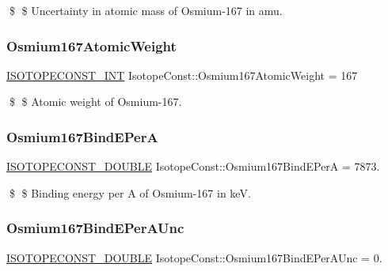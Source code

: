 \$ \$ Uncertainty in atomic mass of Osmium-\/167 in amu. \mbox{\label{group___isotope_const-_osmium-_os167_ga05619135e44b0fca13c9debaf6ab58ed}} 
\subsubsection{\texorpdfstring{Osmium167\+Atomic\+Weight}{Osmium167AtomicWeight}}
{\footnotesize\ttfamily \mbox{\hyperlink{group___isotope_const-_macros_ga5f18360b3e99483a35c32d789e62621c}{I\+S\+O\+T\+O\+P\+E\+C\+O\+N\+S\+T\+\_\+\+I\+NT}} Isotope\+Const\+::\+Osmium167\+Atomic\+Weight = 167}

\$ \$ Atomic weight of Osmium-\/167. \mbox{\label{group___isotope_const-_osmium-_os167_gae01c761b289cca79e813525bfec2d3a3}} 
\subsubsection{\texorpdfstring{Osmium167\+Bind\+E\+PerA}{Osmium167BindEPerA}}
{\footnotesize\ttfamily \mbox{\hyperlink{group___isotope_const-_macros_ga8f45a7272ce02c0b4c65c44636ed719a}{I\+S\+O\+T\+O\+P\+E\+C\+O\+N\+S\+T\+\_\+\+D\+O\+U\+B\+LE}} Isotope\+Const\+::\+Osmium167\+Bind\+E\+PerA = 7873.}

\$ \$ Binding energy per A of Osmium-\/167 in keV. \mbox{\label{group___isotope_const-_osmium-_os167_gaf1b5472dbb10dfd26ca9fbd1b0804372}} 
\subsubsection{\texorpdfstring{Osmium167\+Bind\+E\+Per\+A\+Unc}{Osmium167BindEPerAUnc}}
{\footnotesize\ttfamily \mbox{\hyperlink{group___isotope_const-_macros_ga8f45a7272ce02c0b4c65c44636ed719a}{I\+S\+O\+T\+O\+P\+E\+C\+O\+N\+S\+T\+\_\+\+D\+O\+U\+B\+LE}} Isotope\+Const\+::\+Osmium167\+Bind\+E\+Per\+A\+Unc = 0.}

